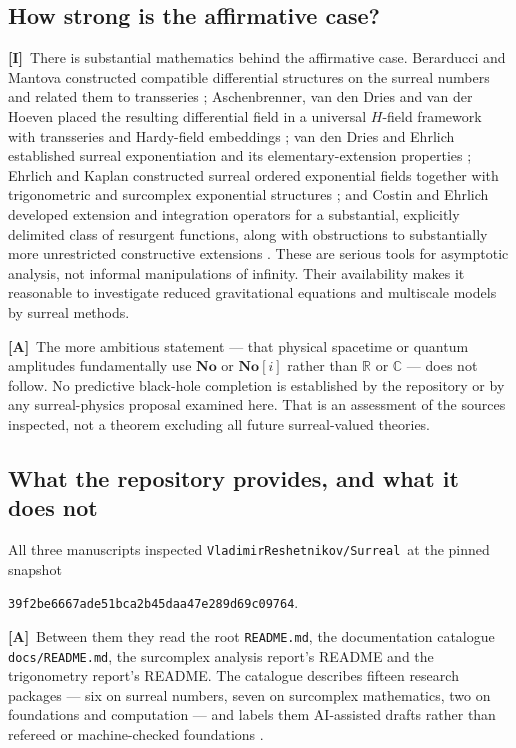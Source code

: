 \documentclass[11pt,letterpaper]{article}
\numberwithin{equation}{section}
\theoremstyle{definition}
\theoremstyle{remark}
\newcommand{\No}{\mathbf{No}}
\newcommand{\SC}{\mathbf{No}[i]}
\newcommand{\R}{\mathbb R}
\newcommand{\C}{\mathbb C}
\newcommand{\Repo}{\texttt{VladimirReshetnikov/Surreal}}
\newcommand{\Commit}{\nolinkurl{39f2be6667ade51bca2b45daa47e289d69c09764}}
\newcommand{\TA}{\textcolor{TierA}{\textsf{\bfseries[A]}}}
\newcommand{\TI}{\textcolor{TierI}{\textsf{\bfseries[I]}}}
\begin{document}
\subsection{How strong is the affirmative case?}
\label{phys:sub:affirmative}

\TI\ There is substantial mathematics behind the affirmative case. Berarducci
and Mantova constructed compatible differential structures on the surreal
numbers and related them to transseries \cite{phys:BM,phys:BMgerms};
Aschenbrenner, van den Dries and van der Hoeven placed the resulting
differential field in a universal $H$-field framework with transseries and
Hardy-field embeddings \cite{phys:ADH}; van den Dries and Ehrlich established
surreal exponentiation and its elementary-extension properties
\cite{phys:vdDE}; Ehrlich and Kaplan constructed surreal ordered exponential
fields together with trigonometric and surcomplex exponential structures
\cite{phys:EK,phys:EKErratum}; and Costin and Ehrlich developed extension and
integration operators for a substantial, explicitly delimited class of
resurgent functions, along with obstructions to substantially more
unrestricted constructive extensions \cite{phys:CE}. These are serious tools
for asymptotic analysis, not informal manipulations of infinity. Their
availability makes it reasonable to investigate reduced gravitational equations
and multiscale models by surreal methods.

\TA\ The more ambitious statement --- that physical spacetime or quantum
amplitudes fundamentally use $\No$ or $\SC$ rather than $\R$ or $\C$ --- does
not follow. No predictive black-hole completion is established by the
repository or by any surreal-physics proposal examined here. That is an
assessment of the sources inspected, not a theorem excluding all future
surreal-valued theories.

\subsection{What the repository provides, and what it does not}
\label{phys:sub:repo}

All three manuscripts inspected \Repo\ at the pinned snapshot
\begin{center}\small\Commit.\end{center}
\TA\ Between them they read the root \texttt{README.md}, the documentation
catalogue \texttt{docs/README.md}, the surcomplex analysis report's README and
the trigonometry report's README. The catalogue describes fifteen research
packages --- six on surreal numbers, seven on surcomplex mathematics, two on
foundations and computation --- and labels them AI-assisted drafts rather than
refereed or machine-checked foundations
\cite{phys:RepoRoot,phys:RepoDocs,phys:RepoAnalysis,phys:RepoTrig}.
\end{document}
